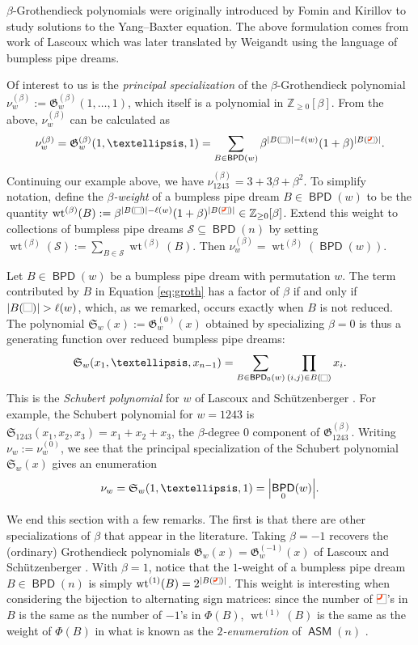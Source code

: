 \documentclass[11pt]{article}
\theoremstyle{definition}
\numberwithin{equation}{section}
\newcommand{\Z}{\mathbb{Z}}
\newcommand{\sseq}{\subseteq}
\newcommand{\fk}{\mathfrak}
\DeclarePairedDelimiter\abs{\lvert}{\rvert}
\DeclareMathOperator{\wt}{wt}
\DeclareMathOperator{\ASM}{\mathsf{ASM}}
\DeclareMathOperator{\BPD}{\mathsf{BPD}}
\newcommand{\pipecolor}{UForange}
\newcommand{\tilescale}{0.27}
\newcommand{\smalltilescale}{0.2}
\newcommand{\drawSquare}{
    \draw[
        xshift=0.5cm,yshift=0.5cm,
        black,opacity=0.5,thin
    ] (0,0) rectangle (1,1);
}
\newcommand{\drawJelbow}[2]{
    \draw[color=\pipecolor,very thick]
    (#1,#2+0.5) to (#1,#2+0.25) to[bend left] (#1-0.25,#2) to (#1-0.5,#2);
}
\newcommand{\blank}[1][scale=\tilescale,baseline=4pt]{
    \begin{tikzpicture}[#1]
    \drawSquare
    \end{tikzpicture}
}
\newcommand{\jelbow}[1][scale=\tilescale,baseline=4pt]{
    \begin{tikzpicture}[#1]
    \drawSquare
    \drawJelbow11
    \end{tikzpicture}
}
\newcommand{\smallblank}{\blank[scale=\smalltilescale,baseline=4pt]}
\newcommand{\smalljelbow}{\jelbow[scale=\smalltilescale,baseline=4pt]}
\begin{document}
$\beta$-Grothendieck polynomials were originally introduced by Fomin and Kirillov \cite{FK94} to study solutions to the Yang--Baxter equation.
The above formulation comes from work of Lascoux \cite{Las02} which was later translated by Weigandt \cite{Wei21} using the language of bumpless pipe dreams.

Of interest to us is the \textit{principal specialization} of the $\beta$-Grothendieck polynomial $\nu_w^{(\beta)} := \fk G_w^{(\beta)}(1,\dots,1)$, which itself is a polynomial in $\Z_{\geq 0}[\beta]$.
From the above, $\nu^{(\beta)}_w$ can be calculated as \[
    \nu^{(\beta)}_w = \fk G^{(\beta)}_w(1,\dots,1) =
    \sum_{B\in \BPD(w)}
    \beta^{\abs*{B(\smallblank)}-\ell(w)}
    (1+\beta)^{\abs*{B(\smalljelbow)}}.
\]
Continuing our example above, we have $\nu_{1243}^{(\beta)} = 3 + 3\beta + \beta^2$.
To simplify notation, define the \textit{$\beta$-weight} of a bumpless pipe dream $B\in \BPD(w)$ to be the quantity $\wt^{(\beta)}(B) := \beta^{\abs*{B(\smallblank)}-\ell(w)} (1+\beta)^{\abs*{B(\smalljelbow)}} \in \Z_{\geq 0}[\beta]$.
Extend this weight to collections of bumpless pipe dreams $\mathcal S\sseq \BPD(n)$ by setting $\wt^{(\beta)}(\mathcal S) := \sum_{B\in \mathcal S} \wt^{(\beta)}(B)$.
Then $\nu^{(\beta)}_w = \wt^{(\beta)}(\BPD(w))$.

Let $B\in \BPD(w)$ be a bumpless pipe dream with permutation $w$.
The term contributed by $B$ in Equation \ref{eq:groth} has a factor of $\beta$ if and only if $\abs*{B(\blank)} > \ell(w)$, which, as we remarked, occurs exactly when $B$ is not reduced.
The polynomial $\fk S_w(x) := \fk G^{(0)}_w(x)$ obtained by specializing $\beta = 0$ is thus a generating function over reduced bumpless pipe dreams: \[
    \fk S_w(x_1,\dots,x_{n-1}) =
    \sum_{B\in \BPD_0(w)}
    \prod_{(i,j)\in B(\smallblank)} x_i.
\]
This is the \textit{Schubert polynomial} for $w$ of Lascoux and Sch\"utzenberger \cite{LS82a,LLS21}.
For example, the Schubert polynomial for $w = 1243$ is $\fk S_{1243}(x_1,x_2,x_3) = x_1+x_2+x_3$, the $\beta$-degree 0 component of $\fk G_{1243}^{(\beta)}$.
Writing $\nu_w := \nu^{(0)}_w$, we see that the principal specialization of the Schubert polynomial $\fk S_w(x)$ gives an enumeration \[
    \nu_w = \fk S_w(1,\dots,1) = \abs*{\BPD_0(w)}.
\]

We end this section with a few remarks.
The first is that there are other specializations of $\beta$ that appear in the literature.
Taking $\beta = -1$ recovers the (ordinary) Grothendieck polynomials $\fk G_w(x) = \fk G_w^{(-1)}(x)$ of Lascoux and Sch\"utzenberger \cite{LS82b}.
With $\beta = 1$, notice that the $1$-weight of a bumpless pipe dream $B\in \BPD(n)$ is simply $\wt^{(1)}(B) = 2^{\abs*{B(\smalljelbow)}}$.
This weight is interesting when considering the bijection to alternating sign matrices:
since the number of $\jelbow$'s in $B$ is the same as the number of $-1$'s in $\Phi(B)$, $\wt^{(1)}(B)$ is the same as the weight of $\Phi(B)$ in what is known as the \textit{$2$-enumeration} of $\ASM(n)$ \cite{EKLP92}.
\end{document}
